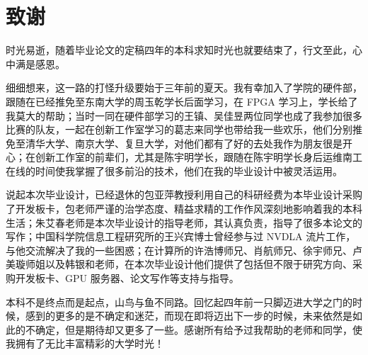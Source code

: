 \chapter[致谢]{致\quad 谢}%
\thispagestyle{noheaderstyle}%

时光易逝，随着毕业论文的定稿四年的本科求知时光也就要结束了，行文至此，心中满是感恩。

细细想来，这一路的打怪升级要始于三年前的夏天。我有幸加入了学院的硬件部，跟随在已经推免至东南大学的周玉乾学长后面学习，在 FPGA 学习上，学长给了我莫大的帮助；当时一同在硬件部学习的王镇、吴佳昱两位同学也成了我参加很多比赛的队友，一起在创新工作室学习的葛志来同学也带给我一些欢乐，他们分别推免至清华大学、南京大学、复旦大学，对他们都有了好的去处我作为朋友很是开心；在创新工作室的前辈们，尤其是陈宇明学长，跟随在陈宇明学长身后运维南工在线的时间使我掌握了很多前沿的技术，他们在我的毕业设计中被灵活运用。

说起本次毕业设计，已经退休的包亚萍教授利用自己的科研经费为本毕业设计采购了开发板卡，包老师严谨的治学态度、精益求精的工作作风深刻地影响着我的本科生活；朱艾春老师是本次毕业设计的指导老师，其认真负责，指导了很多本论文的写作；中国科学院信息工程研究所的王兴宾博士曾经参与过 NVDLA 流片工作，与他交流解决了我的一些困惑；在计算所的许浩博师兄、肖航师兄、徐宇师兄、卢美璇师姐以及韩银和老师，在本次毕业设计他们提供了包括但不限于研究方向、采购开发板卡、GPU 服务器、论文写作等支持与指导。

本科不是终点而是起点，山鸟与鱼不同路。回忆起四年前一只脚迈进大学之门的时候，感到的更多的是不确定和迷茫，而现在即将迈出下一步的时候，未来依然是如此的不确定，但是期待却又更多了一些。感谢所有给予过我帮助的老师和同学，使我拥有了无比丰富精彩的大学时光！

\cleardoublepage[plain]%
